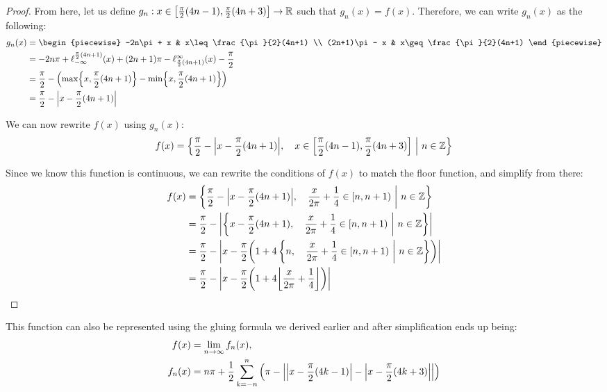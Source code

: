 \begin{proof}
    From here, let us define $g_n:x\in\brak*{\frac{\pi}{2}(4n-1),\frac{\pi}{2}(4n+3)}\to\mathbb{R}$ such that $g_n(x)=f(x)$. Therefore, we can write $g_n(x)$ as the following:
    \begin{align*}
        g_n(x) &= \begin{piecewise}
            -2n\pi + x & x\leq \frac{\pi}{2}(4n+1) \\
            (2n+1)\pi - x & x\geq \frac{\pi}{2}(4n+1)
        \end{piecewise} \\
        &= -2n\pi+\ell_{-\infty}^{\frac{\pi}{2}(4n+1)}\paren*{x}+(2n+1)\pi-\ell_{\frac{\pi}{2}(4n+1)}^{\infty}\paren*{x}-\frac{\pi}{2} \\
        &= \frac{\pi}{2}-\paren*{\max\br*{x,\frac{\pi}{2}(4n+1)}-\min\br*{x,\frac{\pi}{2}(4n+1)}} \\
        &= \frac{\pi}{2}-\abs{x-\frac{\pi}{2}(4n+1)}
    \end{align*}

    We can now rewrite $f(x)$ using $g_n(x)$:
    $$
        f(x) = \pwobj{\frac{\pi}{2}-\abs{x-\frac{\pi}{2}(4n+1)}}{x\in\brak*{\frac{\pi}{2}(4n-1),\frac{\pi}{2}(4n+3)}}{n\in\mathbb{Z}}
    $$

    Since we know this function is continuous, we can rewrite the conditions of $f(x)$ to match the floor function, and simplify from there:
    \begin{align*}
        f(x) &= \pwobj{\frac{\pi}{2}-\abs{x-\frac{\pi}{2}(4n+1)}}{\frac{x}{2\pi}+\frac{1}{4}\in\brakp*{n,n+1}}{n\in\mathbb{Z}} \\
        &= \frac{\pi}{2}-\abs{\pwobj{x-\frac{\pi}{2}(4n+1)}{\frac{x}{2\pi}+\frac{1}{4}\in\brakp*{n,n+1}}{n\in\mathbb{Z}}} \\
        &= \frac{\pi}{2}-\abs{x-\frac{\pi}{2}\paren*{1+4\pwobj{n}{\frac{x}{2\pi}+\frac{1}{4}\in\brakp*{n,n+1}}{n\in\mathbb{Z}}}} \\
        &= \frac{\pi}{2}-\abs{x-\frac{\pi}{2}\paren*{1+4\floor*{\frac{x}{2\pi}+\frac{1}{4}}}}
    \end{align*}
\end{proof}
This function can also be represented using the gluing formula we derived earlier and after simplification ends up being:
\begin{align*}
    f(x) &= \lim_{n\to\infty}{f_n(x)}, \\
    f_n(x) &= n\pi+\frac{1}{2}\sum_{k=-n}^{n}{\paren*{\pi-\abs{\abs{x-\frac{\pi}{2}(4k-1)}-\abs{x-\frac{\pi}{2}(4k+3)}}}}
\end{align*}
\newpage